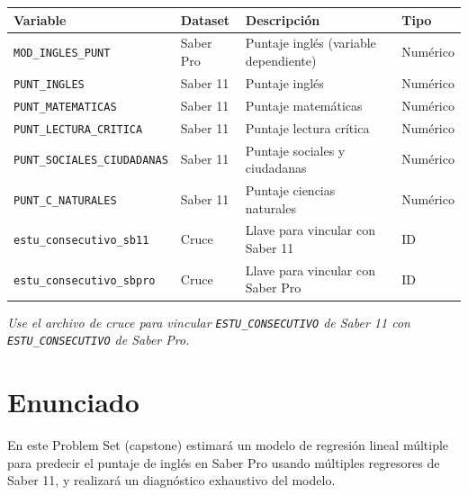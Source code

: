 \documentclass[11pt, a4paper]{article}
\begin{document}
\vspace{4pt}
\begin{tabular}{l l l l}
\toprule
\textbf{Variable} & \textbf{Dataset} & \textbf{Descripci\'on} & \textbf{Tipo} \\
\midrule
\texttt{MOD\_INGLES\_PUNT}          & Saber Pro & Puntaje ingl\'es (variable dependiente)  & Num\'erico \\
\texttt{PUNT\_INGLES}               & Saber 11  & Puntaje ingl\'es                         & Num\'erico \\
\texttt{PUNT\_MATEMATICAS}          & Saber 11  & Puntaje matem\'aticas                    & Num\'erico \\
\texttt{PUNT\_LECTURA\_CRITICA}     & Saber 11  & Puntaje lectura cr\'itica                & Num\'erico \\
\texttt{PUNT\_SOCIALES\_CIUDADANAS} & Saber 11  & Puntaje sociales y ciudadanas            & Num\'erico \\
\texttt{PUNT\_C\_NATURALES}         & Saber 11  & Puntaje ciencias naturales               & Num\'erico \\
\texttt{estu\_consecutivo\_sb11}    & Cruce     & Llave para vincular con Saber 11         & ID \\
\texttt{estu\_consecutivo\_sbpro}   & Cruce     & Llave para vincular con Saber Pro        & ID \\
\bottomrule
\end{tabular}

\vspace{4pt}
\textit{Use el archivo de cruce para vincular \texttt{ESTU\_CONSECUTIVO}
de Saber 11 con \texttt{ESTU\_CONSECUTIVO} de Saber Pro.}

\section*{Enunciado}

En este Problem Set (capstone) estimar\'a un modelo de regresi\'on lineal
m\'ultiple para predecir el puntaje de ingl\'es en Saber Pro usando
m\'ultiples regresores de Saber 11, y realizar\'a un diagn\'ostico exhaustivo
del modelo.
\end{document}
